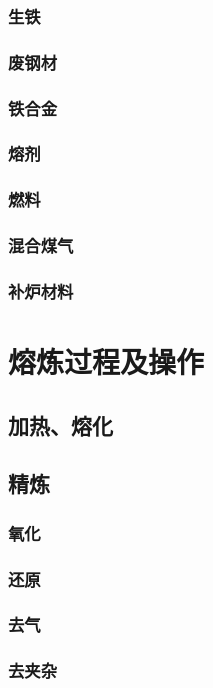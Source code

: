 \documentclass[UTF8]{../../ApplicationUniverse}
\begin{document}
    \subsubsection{生铁}
    \subsubsection{废钢材}
    \subsubsection{铁合金}
    \subsubsection{熔剂}
    \subsubsection{燃料}
    \subsubsection{混合煤气}
    \subsubsection{补炉材料}
\section{熔炼过程及操作}
    \subsection{加热、熔化}
    \subsection{精炼}
        \subsubsection{氧化}
        \subsubsection{还原}
        \subsubsection{去气}
        \subsubsection{去夹杂}
\end{document}
